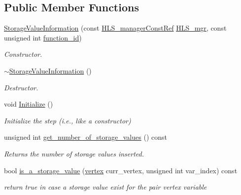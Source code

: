 \subsection*{Public Member Functions}
\begin{DoxyCompactItemize}
\item 
\hyperlink{classStorageValueInformation_a19c290938cd6a5392a07064fe4789d3d}{Storage\+Value\+Information} (const \hyperlink{hls__manager_8hpp_a1b481383e3beabc89bd7562ae672dd8c}{H\+L\+S\+\_\+manager\+Const\+Ref} \hyperlink{classStorageValueInformation_aa60471f4fd3f3c6ca9a2ec472de3de48}{H\+L\+S\+\_\+mgr}, const unsigned int \hyperlink{classStorageValueInformation_ad5a9397ff900616471a7fed787bdce2d}{function\+\_\+id})
\begin{DoxyCompactList}\small\item\em Constructor. \end{DoxyCompactList}\item 
\hyperlink{classStorageValueInformation_add282b820dac0047dca2d2e7670338b8}{$\sim$\+Storage\+Value\+Information} ()
\begin{DoxyCompactList}\small\item\em Destructor. \end{DoxyCompactList}\item 
void \hyperlink{classStorageValueInformation_af5c2b65a807420f83b1cf8d7a8516f5b}{Initialize} ()
\begin{DoxyCompactList}\small\item\em Initialize the step (i.\+e., like a constructor) \end{DoxyCompactList}\item 
unsigned int \hyperlink{classStorageValueInformation_a5ccb95e3ac0776910f8967099f46a679}{get\+\_\+number\+\_\+of\+\_\+storage\+\_\+values} () const
\begin{DoxyCompactList}\small\item\em Returns the number of storage values inserted. \end{DoxyCompactList}\item 
bool \hyperlink{classStorageValueInformation_ad1eb25efaf228bcf4d2b3d62b7b6d102}{is\+\_\+a\+\_\+storage\+\_\+value} (\hyperlink{graph_8hpp_abefdcf0544e601805af44eca032cca14}{vertex} curr\+\_\+vertex, unsigned int var\+\_\+index) const
\begin{DoxyCompactList}\small\item\em return true in case a storage value exist for the pair vertex variable \end{DoxyCompactList}\item 

\end{DoxyCompactItemize}
